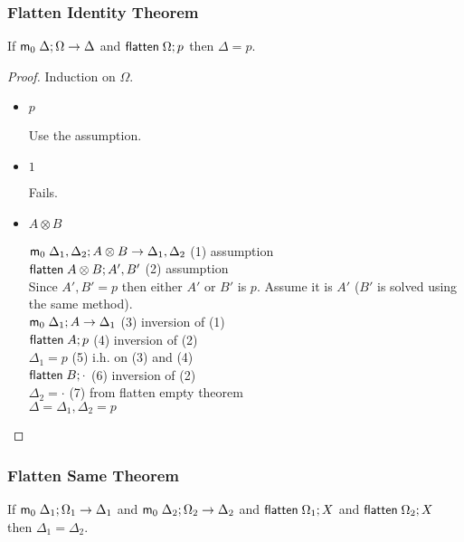 \subsubsection{Flatten Identity Theorem}

If $\mathsf{m}_0 \; \Delta; \Omega \rightarrow \Delta$ and $\mathsf{flatten} \; \Omega; p$ then $\Delta = p$.

\begin{proof}
   Induction on $\Omega$.
   
   \begin{itemize}
      \item $p$
      
      Use the assumption.
      
      \item $1$
      
      Fails.
      
      \item $A \otimes B$
      
      $\mathsf{m}_0 \; \Delta_1, \Delta_2; A \otimes B \rightarrow \Delta_1, \Delta_2$ \hfill (1) assumption \\
      $\mathsf{flatten} \; A \otimes B; A', B'$ \hfill (2) assumption \\
      
      Since $A', B' = p$ then either $A'$ or $B'$ is $p$. Assume it is $A'$ ($B'$ is solved using the same method).\\
      
      $\mathsf{m}_0 \; \Delta_1; A \rightarrow \Delta_1$ \hfill (3) inversion of (1) \\
      $\mathsf{flatten} \; A; p$ \hfill (4) inversion of (2) \\
      $\Delta_1 = p$ \hfill (5) i.h. on (3) and (4) \\
      $\mathsf{flatten} \; B; \cdot$ \hfill (6) inversion of (2) \\
      $\Delta_2 = \cdot$ \hfill (7) from flatten empty theorem \\
      $\Delta = \Delta_1, \Delta_2 = p$ \\
      
   \end{itemize}
\end{proof}

\subsubsection{Flatten Same Theorem}

If $\mathsf{m}_0 \; \Delta_1; \Omega_1 \rightarrow \Delta_1$ and $\mathsf{m}_0 \; \Delta_2; \Omega_2 \rightarrow \Delta_2$ and $\mathsf{flatten} \; \Omega_1; X$ and $\mathsf{flatten} \; \Omega_2; X$ then $\Delta_1 = \Delta_2$.

